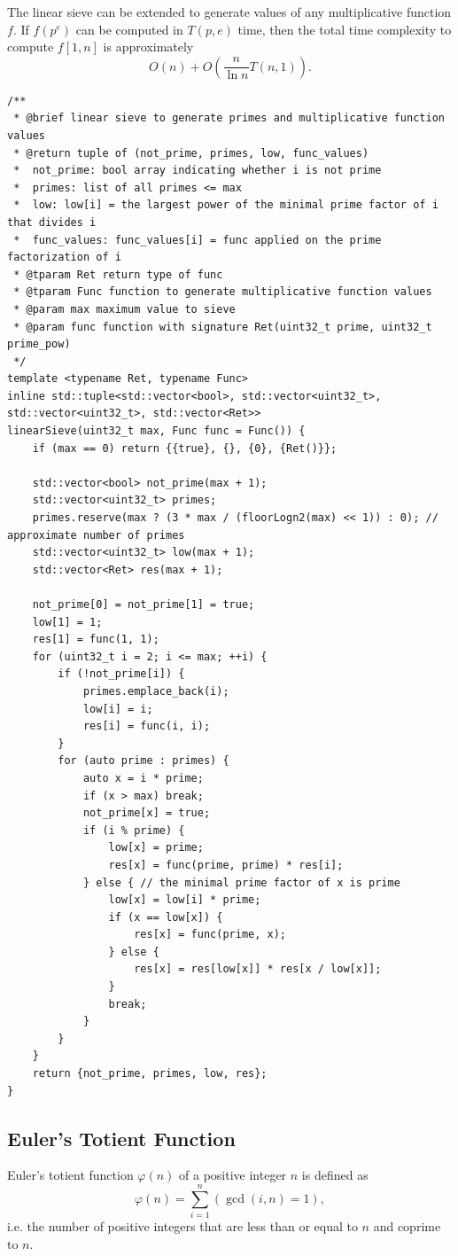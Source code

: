 \documentclass[UTF8]{article}
\begin{document}
The linear sieve can be extended to generate values of any multiplicative function $f$.
If $f(p^e)$ can be computed in $T(p,e)$ time,
then the total time complexity to compute $f[1,n]$ is approximately
$$
	O(n)+O\left(\frac{n}{\ln n}T(n,1)\right).
$$
\begin{verbatim}
/**
 * @brief linear sieve to generate primes and multiplicative function values
 * @return tuple of (not_prime, primes, low, func_values)
 * 	not_prime: bool array indicating whether i is not prime
 * 	primes: list of all primes <= max
 * 	low: low[i] = the largest power of the minimal prime factor of i that divides i
 * 	func_values: func_values[i] = func applied on the prime factorization of i
 * @tparam Ret return type of func
 * @tparam Func function to generate multiplicative function values
 * @param max maximum value to sieve
 * @param func function with signature Ret(uint32_t prime, uint32_t prime_pow)
 */
template <typename Ret, typename Func>
inline std::tuple<std::vector<bool>, std::vector<uint32_t>, std::vector<uint32_t>, std::vector<Ret>>
linearSieve(uint32_t max, Func func = Func()) {
	if (max == 0) return {{true}, {}, {0}, {Ret()}};

	std::vector<bool> not_prime(max + 1);
	std::vector<uint32_t> primes;
	primes.reserve(max ? (3 * max / (floorLogn2(max) << 1)) : 0); // approximate number of primes
	std::vector<uint32_t> low(max + 1);
	std::vector<Ret> res(max + 1);

	not_prime[0] = not_prime[1] = true;
	low[1] = 1;
	res[1] = func(1, 1);
	for (uint32_t i = 2; i <= max; ++i) {
		if (!not_prime[i]) {
			primes.emplace_back(i);
			low[i] = i;
			res[i] = func(i, i);
		}
		for (auto prime : primes) {
			auto x = i * prime;
			if (x > max) break;
			not_prime[x] = true;
			if (i % prime) {
				low[x] = prime;
				res[x] = func(prime, prime) * res[i];
			} else { // the minimal prime factor of x is prime
				low[x] = low[i] * prime;
				if (x == low[x]) {
					res[x] = func(prime, x);
				} else {
					res[x] = res[low[x]] * res[x / low[x]];
				}
				break;
			}
		}
	}
	return {not_prime, primes, low, res};
}
\end{verbatim}

\subsection{Euler's Totient Function}
Euler's totient function $\varphi(n)$ of a positive integer $n$ is defined as
$$
	\varphi(n)=\sum_{i=1}^{n}(\gcd(i,n)=1),
$$
i.e. the number of positive integers that are less than or equal to $n$ and coprime to $n$.
\end{document}
